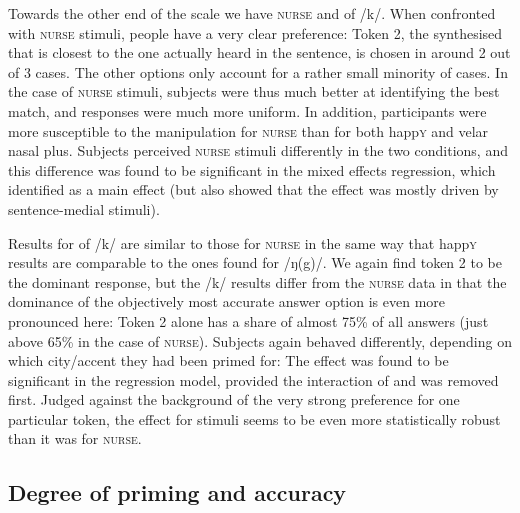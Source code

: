 Towards the other end of the scale we have \textsc{nurse} and  of /k/.
When confronted with \textsc{nurse} stimuli, people have a very clear preference: Token 2, the synthesised  that is closest to the one actually heard in the sentence, is chosen in around 2 out of 3 cases.
The other options only account for a rather small minority of cases.
In the case of \textsc{nurse} stimuli, subjects were thus much better at identifying the best match, and responses were much more uniform.
In addition, participants were more susceptible to the  manipulation for \textsc{nurse} than for both happ\textsc{y} and velar nasal plus.
Subjects perceived \textsc{nurse} stimuli differently in the two  conditions, and this difference was found to be significant in the mixed effects regression, which identified  as a main effect (but also showed that the effect was mostly driven by sentence-medial stimuli).

Results for  of /k/ are similar to those for \textsc{nurse} in the same way that happ\textsc{y} results are comparable to the ones found for /ŋ(g)/.
We again find token 2 to be the dominant response, but the /k/ results differ from the \textsc{nurse} data in that the dominance of the objectively most accurate answer option is even more pronounced here: Token 2 alone has a share of almost 75\% of all answers (just above 65\% in the case of \textsc{nurse}).
Subjects again behaved differently, depending on which city/accent they had been primed for: The  effect was found to be significant in the regression model, provided the interaction of  and  was removed first.
Judged against the background of the very strong preference for one particular token, the  effect for  stimuli seems to be even more statistically robust than it was for \textsc{nurse}.

		\subsection{Degree of priming and accuracy}

